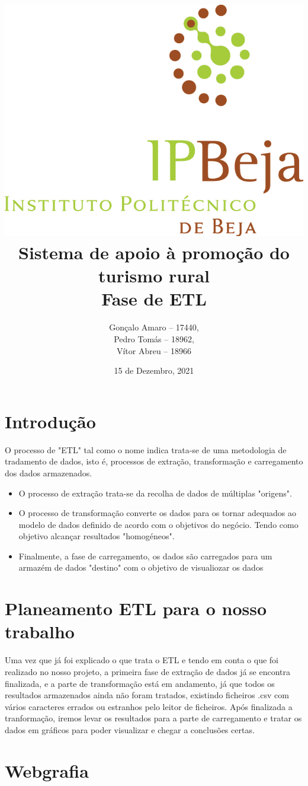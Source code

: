 \documentclass[a4paper,10pt]{article}
\title{\includegraphics[scale=0.5]{ipbeja_logo.png}\\[0.5cm]Sistema de apoio à promoção do turismo rural\\Fase de ETL} %
\author{Gonçalo Amaro -- 17440,\\ Pedro Tomás -- 18962,\\ Vítor Abreu -- 18966} %
\date{15 de Dezembro, 2021} %
\def\blankpage{%
      \clearpage%
      \thispagestyle{empty}%
      \addtocounter{page}{-1}%
      \null%
      \clearpage}
\begin{document}


\maketitle

\blankpage{}

{
  \hypersetup{linkcolor=black}
  \tableofcontents
}

\newpage

\section{Introdução}

O processo de "ETL" tal como o nome indica trata-se de uma metodologia de tradamento de dados, isto é, processos de extração, transformação e carregamento dos dados armazenados.
\begin{itemize}
  \item  O processo de extração trata-se da recolha de dados de múltiplas "origens".
  \item O processo de transformação converte os dados para os tornar adequados ao modelo de dados definido de acordo com o objetivos do negócio. Tendo como objetivo alcançar resultados "homogéneos".
  \item Finalmente, a fase de carregamento, os dados são carregados para um armazém de dados "destino" com o objetivo de visualiozar os dados
\end{itemize}

\section{Planeamento ETL para o nosso trabalho}

Uma vez que já foi explicado o que trata o ETL e tendo em conta o que foi realizado no nosso projeto, a primeira fase de extração de dados já se encontra finalizada, e a parte de transformação está em andamento, já que todos os resultados armazenados ainda não foram tratados, existindo ficheiros .csv com vários caracteres errados ou estranhos pelo leitor de ficheiros. Após finalizada a tranformação, iremos levar os resultados para a parte de carregamento e tratar os dados em gráficos para poder visualizar e chegar a conclusões certas.


\newpage



\section{Webgrafia}

\renewcommand{\bibsection}{}

\end{document}
